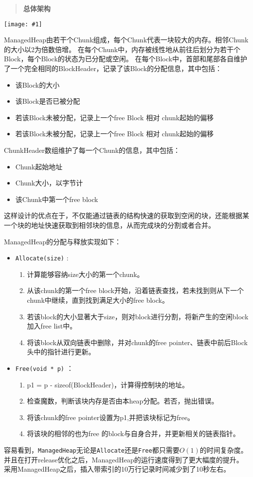 \documentclass[12pt, a4paper]{article}
\def\c#1{\texttt{#1}}
\def\b#1{\textbf{#1}}
\def\p{\par}
\def\g#1{\begin{center}\texttt{[image: \#1]}\end{center}}
\def\q#1{\begin{quote}\b{#1}\end{quote}}
\begin{document}
\q{总体架构}
\g{managedHeap.pdf}
\p ManagedHeap由若干个Chunk组成，每个Chunk代表一块较大的内存。相邻Chunk的大小以2为倍数倍增。
在每个Chunk中，内存被线性地从前往后划分为若干个Block，每个Block的状态为已分配或空闲。
在每个Block中，首部和尾部各自维护了一个完全相同的BlockHeader，记录了该Block的分配信息，其中包括：
\begin{itemize}
  \item 该Block的大小
  \item 该Block是否已被分配
  \item 若该Block未被分配，记录上一个free Block 相对 chunk起始的偏移
  \item 若该Block未被分配，记录上一个free Block 相对 chunk起始的偏移
\end{itemize}
\p ChunkHeader数组维护了每一个Chunk的信息，其中包括：
\begin{itemize}
  \item Chunk起始地址
  \item Chunk大小，以字节计
  \item 该Chunk中第一个free block
\end{itemize}
\p 这样设计的优点在于，不仅能通过链表的结构快速的获取到空闲的块，还能根据某一个块的地址快速获取到相邻块的信息，从而完成块的分割或者合并。
\p ManagedHeap的分配与释放实现如下：
\begin{itemize}
  \item \c{Allocate(size)} : \begin{enumerate}
    \item 计算能够容纳size大小的第一个chunk。
    \item 从该chunk的第一个free block开始，沿着链表查找，若未找到则从下一个chunk中继续，直到找到满足大小的free block。
    \item 若该block的大小显著大于size，则对block进行分割，将新产生的空闲block加入free list中。
    \item 将该block从双向链表中删除，并对chunk的free pointer、链表中前后Block头中的指针进行更新。
  \end{enumerate}
  \item \c{Free(void * p)} ：\begin{enumerate}
    \item p1 = p - sizeof(BlockHeader)，计算得控制块的地址。
    \item 检查魔数，判断该块内存是否由本heap分配。若否，抛出错误。
    \item 将该chunk的free pointer设置为p1,并把该块标记为free。
    \item 将该块的相邻的也为free 的block与自身合并，并更新相关的链表指针。
  \end{enumerate}
\end{itemize}
\p 容易看到，\c{ManagedHeap}无论是\c{Allocate}还是\c{Free}都只需要$O(1)$的时间复杂度。并且在打开release优化之后，ManagedHeap的运行速度得到了更大幅度的提升。采用ManagedHeap之后，插入带索引的10万行记录时间减少到了10秒左右。
\end{document}
